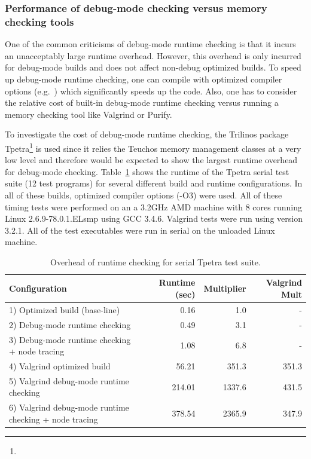 \documentclass[pdf,ps2pdf,11pt]{SANDreport}
\begin{document}
%
{}\subsubsection{Performance of debug-mode checking versus memory
checking tools}
%

One of the common criticisms of debug-mode runtime checking is that it
incurs an unacceptably large runtime overhead.  However, this overhead
is only incurred for debug-mode builds and does not affect non-debug
optimized builds.  To speed up debug-mode runtime checking, one can
compile with optimized compiler options (e.g.\ {}) which
significantly speeds up the code.  Also, one has to consider the
relative cost of built-in debug-mode runtime checking versus running a
memory checking tool like Valgrind or Purify.

To investigate the cost of debug-mode runtime checking, the Trilinos
package
Tpetra\footnote{{}}
is used since it relies the Teuchos memory management classes at a
very low level and therefore would be expected to show the largest
runtime overhead for debug-mode checking.
Table~\ref{tbl:overhead-of-runtime-checking} shows the runtime of the
Tpetra serial test suite (12 test programs) for several different
build and runtime configurations.  In all of these builds, optimized
compiler options (-O3) were used.  All of these timing tests were
performed on an a 3.2GHz AMD machine with 8 cores running Linux
2.6.9-78.0.1.ELsmp using GCC 3.4.6.  Valgrind tests were run using
version 3.2.1.  All of the test executables were run in serial on the
unloaded Linux machine.

\begin{table}
%
\begin{center}
%
{\small\begin{tabular}{|l|r|r|r|}
\hline
Configuration
& Runtime (sec)
& Multiplier
& Valgrind Mult \\
\hline
\hline
1) Optimized build (base-line)
& 0.16
& 1.0
& - \\
\hline
2) Debug-mode runtime checking
& 0.49
& 3.1
& - \\
\hline
3) Debug-mode runtime checking + node tracing
& 1.08
& 6.8
& - \\
\hline
4) Valgrind optimized build
& 56.21
& 351.3
& 351.3 \\
\hline
5) Valgrind debug-mode runtime checking
& 214.01
& 1337.6
& 431.5 \\
\hline
6) Valgrind debug-mode runtime checking + node tracing
& 378.54
& 2365.9
& 347.9 \\
\hline
\end{tabular}}
%
\end{center}
%
\caption{\label{tbl:overhead-of-runtime-checking}
Overhead of runtime checking for serial Tpetra test suite.}
%
\end{table}
\end{document}
